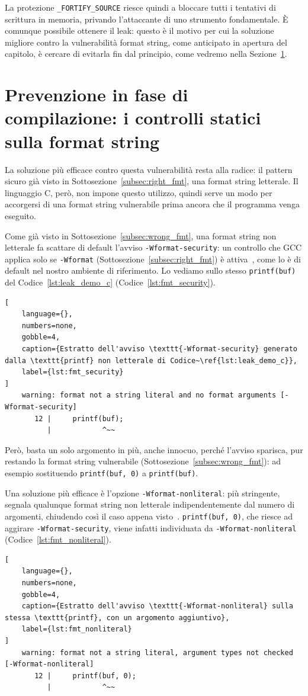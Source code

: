 La protezione \texttt{\_FORTIFY\_SOURCE} riesce quindi a bloccare tutti i tentativi di scrittura in memoria, privando l'attaccante di uno strumento fondamentale. È comunque possibile ottenere il leak: questo è il motivo per cui la soluzione migliore contro la vulnerabilità format string, come anticipato in apertura del capitolo, è cercare di evitarla fin dal principio, come vedremo nella Sezione~\ref{sec:prevention}.


\section{Prevenzione in fase di compilazione: i controlli statici sulla format string}\label{sec:prevention}
La soluzione più efficace contro questa vulnerabilità resta alla radice: il pattern sicuro già visto in Sottosezione~\ref{subsec:right_fmt}, una format string letterale. Il linguaggio C, però, non impone questo utilizzo, quindi serve un modo per accorgersi di una format string vulnerabile prima ancora che il programma venga eseguito.
 
Come già visto in Sottosezione~\ref{subsec:wrong_fmt}, una format string non letterale fa scattare di default l'avviso \texttt{-Wformat-security}: un controllo che GCC applica solo se \texttt{-Wformat} (Sottosezione~\ref{subsec:right_fmt}) è attiva~\cite{gccwopts}, come lo è di default nel nostro ambiente di riferimento. Lo vediamo sullo stesso \texttt{printf(buf)} del Codice~\ref{lst:leak_demo_c} (Codice~\ref{lst:fmt_security}).
\begin{lstlisting}[
    language={},
    numbers=none,
    gobble=4,
    caption={Estratto dell'avviso \texttt{-Wformat-security} generato dalla \texttt{printf} non letterale di Codice~\ref{lst:leak_demo_c}},
    label={lst:fmt_security}
]
    warning: format not a string literal and no format arguments [-Wformat-security]
       12 |     printf(buf);
          |            ^~~
\end{lstlisting}

Però, basta un solo argomento in più, anche innocuo, perché l'avviso sparisca, pur restando la format string vulnerabile (Sottosezione~\ref{subsec:wrong_fmt}): ad esempio sostituendo \texttt{printf(buf, 0)} a \texttt{printf(buf)}.

Una soluzione più efficace è l'opzione \texttt{-Wformat-nonliteral}: più stringente, segnala qualunque format string non letterale indipendentemente dal numero di argomenti, chiudendo così il caso appena visto~\cite{gccwopts}. \texttt{printf(buf, 0)}, che riesce ad aggirare \texttt{-Wformat-security}, viene infatti individuata da \texttt{-Wformat-nonliteral} (Codice~\ref{lst:fmt_nonliteral}).
\begin{lstlisting}[
    language={},
    numbers=none,
    gobble=4,
    caption={Estratto dell'avviso \texttt{-Wformat-nonliteral} sulla stessa \texttt{printf}, con un argomento aggiuntivo},
    label={lst:fmt_nonliteral}
]
    warning: format not a string literal, argument types not checked [-Wformat-nonliteral]
       12 |     printf(buf, 0);
          |            ^~~
\end{lstlisting}

